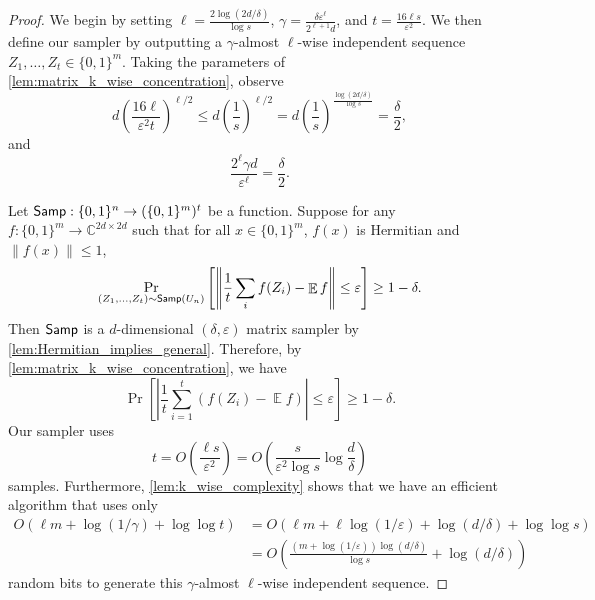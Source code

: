 \documentclass[10pt,a4paper]{article}
\newcommand{\C}{\mathbb{C}}
\DeclareMathOperator*{\E}{\mathbb{E}}
\newcommand{\eps}{\varepsilon}
\newcommand{\1}{\mathbbm{1}}
\newcommand{\norm}[1]{\left\lVert #1\right\rVert}
\newcommand{\abs}[1]{\left|#1\right| }
\newcommand{\tuple}[1]{\left(#1\right)}
\newcommand{\zo}{\{0, 1\}}
\newcommand{\Smp}{\textup{\textsf{Samp}}}
\newcommand{\Prb}[2][]{\Pr_{#1}\left[#2\right]}
\begin{document}
\begin{proof}
    We begin by setting $\ell = \frac{2\log(2d / \delta)}{\log s}$, $\gamma = \frac{\delta\eps^\ell}{2^{\ell + 1}d}$,  and $t = \frac{16\ell s}{\eps^{2}}$. We then define our sampler by outputting a $\gamma$-almost $\ell$-wise independent  sequence $Z_1, \dots, Z_t \in \zo^m$. 
    Taking the parameters of \cref{lem:matrix_k_wise_concentration}, observe \[
    d \left( \frac{16\ell}{\eps^2 t} \right)^{\ell/2}  \le d\tuple{\frac{1}{{s}}}^{\ell / 2} = d\tuple{\frac{1}{{s}}}^{\frac{\log(2d/\delta)}{\log s}}
        =  \frac{\delta}{2},
    \]
    and \[
        \frac{2^\ell\gamma d}{\eps^\ell} = \frac{\delta}{2}.
    \]

     Let $\Smp: \zo^n \to (\zo^m)^t$ be a function. Suppose for any $f: \zo^m \to \C^{2d\times 2d}$ such that for all $x \in \zo^m$, $f(x)$ is Hermitian and $\|f(x)\| \le 1$,     \[
    \Pr_{(Z_1, \dots, Z_t) \sim \Smp(U_n)}
    \left[ \norm{\frac{1}{t}  \sum_i f(Z_i) - \E f} \leq \varepsilon \right]
    \geq 1 - \delta.
    \]
    Then $\Smp$ is a $d$-dimensional $(\delta, \eps)$ matrix sampler by \cref{lem:Hermitian_implies_general}.
     Therefore, by \cref{lem:matrix_k_wise_concentration}, we have \[
        \Prb{\abs{\frac{1}{t}\sum_{i=1}^t (f(Z_i) - \E f)} \le \eps} \ge 1 - \delta.
    \]
    Our sampler uses \[
        t = O\tuple{\frac{\ell s}{\eps^2}} = O\tuple{\frac{s}{\eps^2 \log s}\log\frac{d}{\delta}}
    \]
    samples.
     Furthermore, \cref{lem:k_wise_complexity} shows that we have an efficient algorithm that uses only 
     \begin{align*}
         O(\ell m + \log (1 / \gamma) + \log\log t) &=  O\tuple{\ell m + \ell\log(1 / \eps)  + \log(d / \delta) +  \log\log s} \\
         &=  O\tuple{\frac{(m + \log(1/\eps)) \log (d / \delta)}{\log s} + \log (d / \delta)} 
     \end{align*}
     random bits to generate this $\gamma$-almost $\ell$-wise independent  sequence.
\end{proof}
\end{document}
